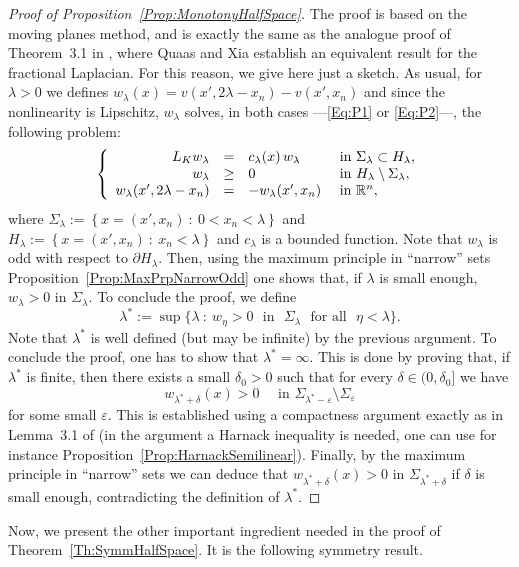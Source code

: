 \begin{proof}[Proof of Proposition~\ref{Prop:MonotonyHalfSpace}]
	The proof is based on the moving planes method, and is exactly the same as the analogue proof of Theorem~3.1 in \cite{QuaasXia}, where Quaas and Xia establish an equivalent result for the fractional Laplacian. For this reason, we give here just a sketch. As usual, for $\lambda > 0$ we defines $w_\lambda (x) = v(x',2\lambda - x_n)-v(x',x_n)$ and since the nonlinearity is Lipschitz, $w_\lambda$ solves, in both cases ---\eqref{Eq:P1} or \eqref{Eq:P2}---, the following problem:
	$$
	\left\{\begin{array}{rcll} 
	L_K  w_\lambda &=& c_\lambda(x)\,w_\lambda  &\textrm{ in } \Sigma_\lambda\subset H_\lambda,\\ 
	w_\lambda &\geq& 0 &\textrm{ in } H_\lambda\setminus\Sigma_\lambda,\\ 
	w_\lambda(x',2\lambda - x_n) &=& - w_\lambda(x',x_n)  &\textrm{ in } \mathbb{R}^n, 
	\end{array} \right. 
	$$
	where $\Sigma_\lambda := \left\{ x = (x',x_n) \ : \ 0<x_n<\lambda \right\}$ and $H_\lambda := \left\{ x = (x',x_n) \ : \ x_n<\lambda \right\}$ and $c_\lambda$ is a bounded function. Note that $w_\lambda$ is odd with respect to $\partial H_\lambda$. Then, using the maximum principle in ``narrow'' sets  Proposition~\ref{Prop:MaxPrpNarrowOdd} one shows that, if $\lambda$ is small enough, $w_\lambda>0$ in $\Sigma_\lambda$. To conclude the proof, we define
	$$
	\lambda^* := \sup\{\lambda \ : \ w_\eta>0 \,\, \text{ in } \,\, \Sigma_\lambda \,\, \text{ for all } \,\, \eta<\lambda\}.
	$$
	Note that $\lambda^*$ is well defined (but may be infinite) by the previous argument. To conclude the proof, one has to show that $\lambda^*=\infty$. This is done by proving that, if $\lambda^*$ is finite, then there exists a small $\delta_0 > 0$ such that for every $\delta \in (0,\delta_0]$ we have
	$$
	w_{\lambda^* +  \delta} (x) > 0 \quad \text{ in } \Sigma_{\lambda^*-\varepsilon}\setminus \Sigma_{\varepsilon}
	$$
	for some small $\varepsilon$. This is established using a compactness argument exactly as in Lemma~3.1 of \cite{QuaasXia} (in the argument a Harnack inequality is needed, one can use for instance Proposition~\ref{Prop:HarnackSemilinear}). Finally, by the maximum principle in ``narrow'' sets we can deduce that $w_{\lambda^* +  \delta} (x) > 0 $ in $\Sigma_{\lambda^*+\delta}$ if $\delta$ is small enough, contradicting the definition of $\lambda^*$.
\end{proof}


Now, we present the other important ingredient needed in the proof of Theorem~\ref{Th:SymmHalfSpace}. It is the following symmetry result.

